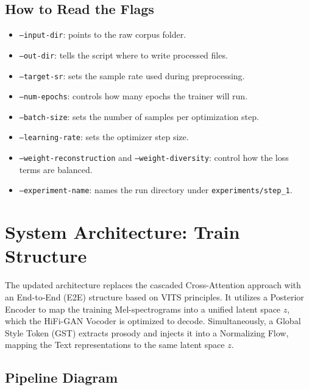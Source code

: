 \documentclass[11pt]{article}
\newcommand{\pathtt}[1]{\texttt{#1}}
\begin{document}
\subsection{How to Read the Flags}
\begin{itemize}[leftmargin=1.5em]
  \item \pathtt{--input-dir}: points to the raw corpus folder.
  \item \pathtt{--out-dir}: tells the script where to write processed files.
  \item \pathtt{--target-sr}: sets the sample rate used during preprocessing.
  \item \pathtt{--num-epochs}: controls how many epochs the trainer will run.
  \item \pathtt{--batch-size}: sets the number of samples per optimization step.
  \item \pathtt{--learning-rate}: sets the optimizer step size.
  \item \pathtt{--weight-reconstruction} and \pathtt{--weight-diversity}: control how the loss terms are balanced.
  \item \pathtt{--experiment-name}: names the run directory under \pathtt{experiments/step\_1}.
\end{itemize}

\section{System Architecture: Train Structure}

The updated architecture replaces the cascaded Cross-Attention approach with an End-to-End (E2E) structure based on VITS principles. It utilizes a Posterior Encoder to map the training Mel-spectrograms into a unified latent space $z$, which the HiFi-GAN Vocoder is optimized to decode. Simultaneously, a Global Style Token (GST) extracts prosody and injects it into a Normalizing Flow, mapping the Text representations to the same latent space $z$.

\subsection{Pipeline Diagram}
\end{document}
